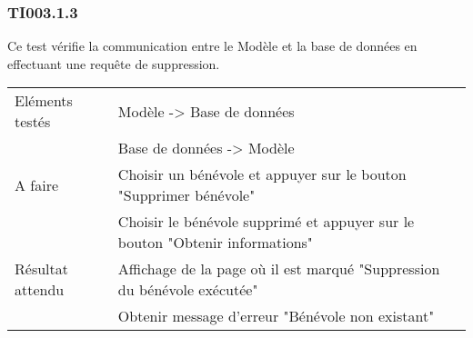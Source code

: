   	\subsubsection{TI003.1.3}
  		Ce test vérifie la communication entre le Modèle et la base de données en effectuant une requête de suppression.
  		\begin{center}
    	 		\begin{tabular}[h]{|p{}|p{}|}
			\hline
				Eléments testés & Modèle -> Base de données  \\
							    &  Base de données -> Modèle \\\hline
    				A faire & Choisir un bénévole et appuyer sur le bouton "Supprimer bénévole" \\
    						& Choisir le bénévole supprimé et appuyer sur le bouton "Obtenir informations" \\\hline
    				Résultat attendu & Affichage de la page où il est marqué "Suppression du bénévole exécutée" \\  								 & Obtenir message d'erreur "Bénévole non existant" \\\hline
     		\end{tabular}
  		\end{center}	